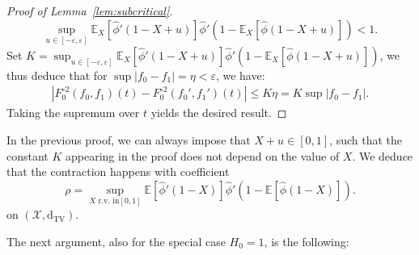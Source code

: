 \documentclass[11pt]{article}
\newcommand{\eps}{\varepsilon}
\begin{document}
\begin{proof}[Proof of Lemma~\ref{lem:subcritical}]
\[ \sup_{u \in [-\eps,\eps]} \mathbb{E}_X[\hat{\phi}'(1-X+u)]\hat{\phi}'\left( 1-\mathbb{E}_X\left[\hat{\phi}(1-X+u)\right]\right)  <1.\]
Set $K=\sup_{u \in [-\eps,\eps]} \mathbb{E}_X[\hat{\phi}'(1-X+u)]\hat{\phi}'\left( 1-\mathbb{E}_X\left[\hat{\phi}(1-X+u)\right]\right)$, we thus deduce that for $\sup |f_0-f_1|= \eta < \eps$, we have:
\begin{align*}
    |F^{\circ 2}_0(f_0,f_1)(t)-F^{\circ 2}_0(f_0',f_1')(t)| 
    \leq K\eta =K\sup|f_0-f_1|.
\end{align*}
Taking the supremum over $t$ yields the desired result.
\end{proof}
\begin{remark}
    In the previous proof, we can always impose that $X+u \in [0,1]$, such that the constant $K$ appearing in the proof does not depend on the value of $X$. We deduce that the contraction happens with coefficient 
    \[ \rho= 
      \sup_{X \text{ r.v. in} [0,1]} \mathbb{E}\left[ \hat{\phi}'(1-X)\right] \hat{\phi}'\left(1-\mathbb{E}\left[\hat{\phi}(1-X)\right]\right)  .\]
    on $(\mathcal{X},\mathrm{d}_{\mathrm{TV}})$.
\end{remark}
The next argument, also for the special case $H_0=1$, is the following:
\end{document}
